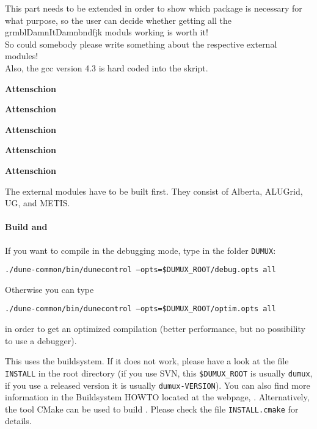 {\it

  This  part needs to be extended in order to show which package is necessary for what purpose, 
  so the user can decide whether getting all the grmblDamnItDamnbndfjk 
  moduls working is worth it! \\

  So could somebody please write something about the respective external modules!\\ 

Also, the gcc version 4.3 is hard coded into the skript. }

\begin{turn}{45}\textbf{Attenschion}\end{turn}
\begin{turn}{45}\textbf{Attenschion}\end{turn}
\begin{turn}{45}\textbf{Attenschion}\end{turn}
\begin{turn}{45}\textbf{Attenschion}\end{turn}
\begin{turn}{45}\textbf{Attenschion}\end{turn}

The external modules have to be built first. They consist of Alberta, ALUGrid, UG, and METIS.

\paragraph{Build \Dune and \Dumux}
\label{buildIt}
If you want to compile in the debugging mode, type in the folder \texttt{DUMUX}: 
\begin{center}
\texttt{./dune-common/bin/dunecontrol --opts=\$DUMUX\_ROOT/debug.opts all}
\end{center}

Otherwise you can type
\begin{center}
\texttt{./dune-common/bin/dunecontrol --opts=\$DUMUX\_ROOT/optim.opts all}
\end{center}
in order to get an optimized compilation (better performance, but no possibility to use a debugger).

This uses the \Dune buildsystem. If it does not work, please have a look at the file \texttt{INSTALL} in the \Dumux root directory (if you use SVN, this \texttt{\$DUMUX\_ROOT} is usually \texttt{dumux}, if you use a released version it is usually \texttt{dumux-VERSION}). You can also find more information in the \Dune Buildsystem HOWTO located at the \Dune webpage, \cite{DUNE-HP}.  Alternatively, the tool CMake can be used to build \Dumux. Please check the file \texttt{INSTALL.cmake} for details.
